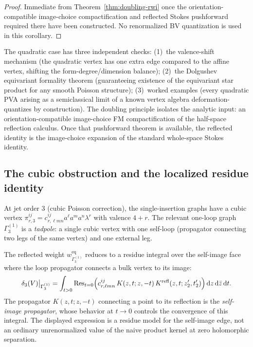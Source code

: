 \begin{proof}
Immediate from Theorem~\ref{thm:doubling-rwi} once the
orientation-compatible image-choice compactification and reflected
Stokes pushforward required there have been constructed. No
renormalized BV quantization is used in this corollary.
\end{proof}

\begin{remark}
The quadratic case has three independent checks:
(1)~the valence-shift mechanism (the quadratic vertex has one extra
edge compared to the affine vertex, shifting the form-degree/dimension
balance); (2)~the Dolgushev equivariant formality theorem (guaranteeing
existence of the equivariant star product for any smooth Poisson
structure); (3)~worked examples (every quadratic PVA arising as a
semiclassical limit of a known vertex algebra deformation-quantizes by
construction). The doubling principle isolates the analytic
input: an orientation-compatible image-choice FM compactification of
the half-space reflection calculus. Once that pushforward theorem is
available, the reflected identity is the image-choice expansion of the
standard whole-space Stokes identity.
\end{remark}

\subsection{The cubic obstruction and the localized residue identity}

\begin{construction}
\label{cons:cubic-localization}
At jet order $3$ (cubic Poisson correction), the single-insertion graphs
have a cubic vertex
$\pi^{ij}_{r,3}=c^{ij}_{r,\ell mn}a^\ell a^m a^n\lambda^r$
with valence $4+r$. The relevant one-loop graph $\Gamma_3^{(1)}$ is a
\emph{tadpole}: a single cubic vertex with one self-loop (propagator
connecting two legs of the same vertex) and one external leg.

The reflected weight $w_{\Gamma_3^{(1)}}^{\mathrm{eq}}$ reduces to a
residue integral over the self-image face where the loop propagator
connects a bulk vertex to its image:
\[
\delta_3(V)\big|_{\Gamma_3^{(1)}}
=
\int_{t>0}
\operatorname{Res}_{t=0}
\Bigl(
c^{ij}_{r,\ell mn}\,K(z,t;z,-t)\,K^{\mathrm{refl}}(z,t;z'_2,t'_2)
\Bigr)
\,\mathrm{d}z\,\mathrm{d}\bar z\,\mathrm{d}t.
\]
The propagator $K(z,t;z,-t)$ connecting a point to its reflection is the
\emph{self-image propagator}, whose behavior at $t\to 0$ controls
the convergence of this integral. The displayed expression is a residue
model for the self-image edge, not an ordinary unrenormalized value of
the naive product kernel at zero holomorphic separation.
\end{construction}

